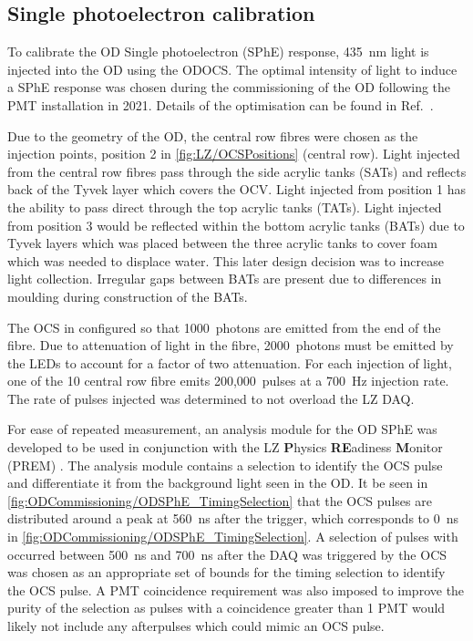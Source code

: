 \subsection{Single photoelectron calibration}\label{sec:ODComissioning/SPhECalib}
To calibrate the OD Single photoelectron (SPhE) response, 435~nm light is injected into the OD using the ODOCS. The optimal intensity of light to induce a SPhE response was chosen during the commissioning of the OD following the PMT installation in 2021. Details of the optimisation can be found in Ref.~\cite{edfraser:thesis}.

Due to the geometry of the OD, the central row fibres were chosen as the injection points, position 2 in \autoref{fig:LZ/OCSPositions} (central row). Light injected from the central row fibres pass through the side acrylic tanks (SATs) and reflects back of the Tyvek layer which covers the OCV.
Light injected from position 1 has the ability to pass direct through the top acrylic tanks (TATs). Light injected from position 3 would be reflected within the bottom acrylic tanks (BATs) due to Tyvek layers which was placed between the three acrylic tanks to cover foam which was needed to displace water. This later design decision was to increase light collection. Irregular gaps between BATs are present due to differences in moulding during construction of the BATs.

The OCS in configured so that 1000~photons are emitted from the end of the fibre. Due to attenuation of light in the fibre, 2000~photons must be emitted by the LEDs to account for a factor of two attenuation. For each injection of light, one of the 10 central row fibre emits 200,000~pulses at a 700~Hz injection rate. The rate of pulses injected was determined to not overload the LZ DAQ.

For ease of repeated measurement, an analysis module for the OD SPhE was developed to be used in conjunction with the LZ \textbf{P}hysics \textbf{RE}adiness \textbf{M}onitor (PREM) \cite{LZTDR}. The analysis module contains a selection to identify the OCS pulse and differentiate it from the background light seen in the OD. It be seen in \autoref{fig:ODCommissioning/ODSPhE_TimingSelection} that the OCS pulses are distributed around a peak at 560~ns after the trigger, which corresponds to 0~ns in \autoref{fig:ODCommissioning/ODSPhE_TimingSelection}. A selection of pulses with occurred between 500~ns and 700~ns after the DAQ was triggered by the OCS was chosen as an appropriate set of bounds for the timing selection to identify the OCS pulse. A PMT coincidence requirement was also imposed to improve the purity of the selection as pulses with a coincidence greater than 1 PMT would likely not include any afterpulses which could mimic an OCS pulse.

